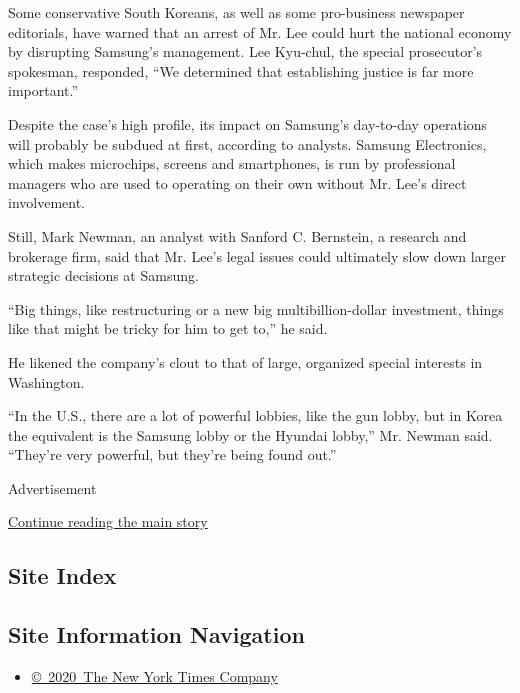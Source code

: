 Some conservative South Koreans, as well as some pro-business newspaper
editorials, have warned that an arrest of Mr. Lee could hurt the
national economy by disrupting Samsung's management. Lee Kyu-chul, the
special prosecutor's spokesman, responded, ``We determined that
establishing justice is far more important.''

Despite the case's high profile, its impact on Samsung's day-to-day
operations will probably be subdued at first, according to analysts.
Samsung Electronics, which makes microchips, screens and smartphones, is
run by professional managers who are used to operating on their own
without Mr. Lee's direct involvement.

Still, Mark Newman, an analyst with Sanford C. Bernstein, a research and
brokerage firm, said that Mr. Lee's legal issues could ultimately slow
down larger strategic decisions at Samsung.

``Big things, like restructuring or a new big multibillion-dollar
investment, things like that might be tricky for him to get to,'' he
said.

He likened the company's clout to that of large, organized special
interests in Washington.

``In the U.S., there are a lot of powerful lobbies, like the gun lobby,
but in Korea the equivalent is the Samsung lobby or the Hyundai lobby,''
Mr. Newman said. ``They're very powerful, but they're being found out.''

Advertisement

\protect\hyperlink{after-bottom}{Continue reading the main story}

\hypertarget{site-index}{%
\subsection{Site Index}\label{site-index}}

\hypertarget{site-information-navigation}{%
\subsection{Site Information
Navigation}\label{site-information-navigation}}

\begin{itemize}
\tightlist
\item
  \href{https://help.nytimes.com/hc/en-us/articles/115014792127-Copyright-notice}{©~2020~The
  New York Times Company}
\end{itemize}

